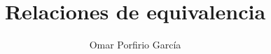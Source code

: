 




\newcommand\course{Subject}
\newcommand\Informationa{Omar Porfirio García}



\author{Omar Porfirio García}

\title{Relaciones de equivalencia}